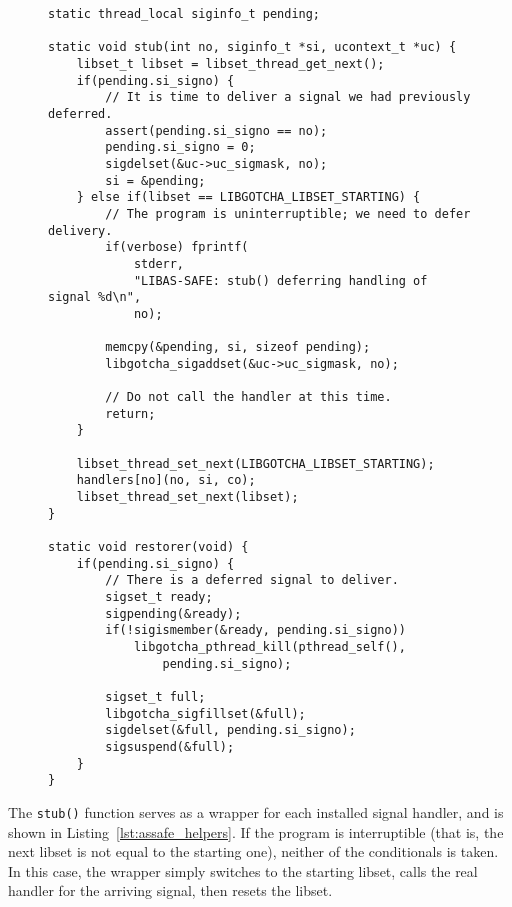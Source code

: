 \begin{figure}[p]
\begin{fullpage}
\begin{lstlisting}[label=lst:assafe_helpers,caption=\textit{libas-safe}'s signal handler wrapper and control library callback,morekeywords=thread_local]
static thread_local siginfo_t pending;

static void stub(int no, siginfo_t *si, ucontext_t *uc) {
	libset_t libset = libset_thread_get_next();
	if(pending.si_signo) {
		// It is time to deliver a signal we had previously deferred.
		assert(pending.si_signo == no);
		pending.si_signo = 0;
		sigdelset(&uc->uc_sigmask, no);
		si = &pending;
	} else if(libset == LIBGOTCHA_LIBSET_STARTING) {
		// The program is uninterruptible; we need to defer delivery.
		if(verbose) fprintf(
			stderr,
			"LIBAS-SAFE: stub() deferring handling of signal %d\n",
			no);

		memcpy(&pending, si, sizeof pending);
		libgotcha_sigaddset(&uc->uc_sigmask, no);

		// Do not call the handler at this time.
		return;
	}

	libset_thread_set_next(LIBGOTCHA_LIBSET_STARTING);
	handlers[no](no, si, co);
	libset_thread_set_next(libset);
}

static void restorer(void) {
	if(pending.si_signo) {
		// There is a deferred signal to deliver.
		sigset_t ready;
		sigpending(&ready);
		if(!sigismember(&ready, pending.si_signo))
			libgotcha_pthread_kill(pthread_self(),
				pending.si_signo);

		sigset_t full;
		libgotcha_sigfillset(&full);
		sigdelset(&full, pending.si_signo);
		sigsuspend(&full);
	}
}
\end{lstlisting}
\end{fullpage}
\end{figure}

The \texttt{stub()} function serves as a wrapper for each installed signal handler,
and is shown in Listing~\ref{lst:assafe_helpers}.  If the program is interruptible
(that is, the next libset is not equal to the starting one), neither of the
conditionals is taken.  In this case, the wrapper simply switches to the starting
libset, calls the real handler for the arriving signal, then resets the libset.

